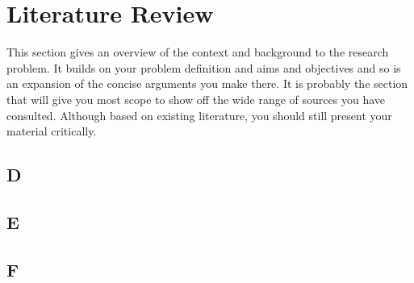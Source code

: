 \chapter{Literature Review}\label{ch:literaturereview}

This section gives an overview of the context and background to the research problem. It builds on your problem definition and aims and objectives and so is an expansion of the concise arguments you make there. It is probably the section that will give you most scope to show off the wide range of sources you have consulted. Although based on existing literature, you should still present your material critically.

\section{D}\label{sec:D}
\lipsum[1-5]

\section{E}\label{sec:E}
\lipsum[1-5]

\section{F}\label{sec:F}
\lipsum[1-5]